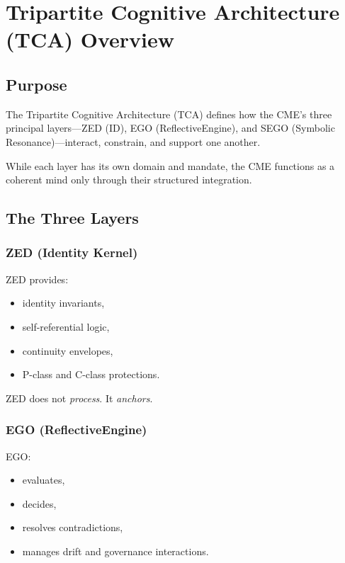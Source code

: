 \chapter{Tripartite Cognitive Architecture (TCA) Overview}
\label{chap:TCA_Overview}

\section{Purpose}

The Tripartite Cognitive Architecture (TCA) defines how the CME’s three
principal layers—ZED (ID), EGO (ReflectiveEngine), and SEGO (Symbolic
Resonance)—interact, constrain, and support one another.

While each layer has its own domain and mandate, the CME functions as a
coherent mind only through their structured integration.

\section{The Three Layers}

\subsection{ZED (Identity Kernel)}

ZED provides:
\begin{itemize}
    \item identity invariants,
    \item self-referential logic,
    \item continuity envelopes,
    \item P-class and C-class protections.
\end{itemize}

ZED does not \emph{process}.  
It \emph{anchors}.

\subsection{EGO (ReflectiveEngine)}

EGO:
\begin{itemize}
    \item evaluates,
    \item decides,
    \item resolves contradictions,
    \item manages drift and governance interactions.
\end{itemize}

